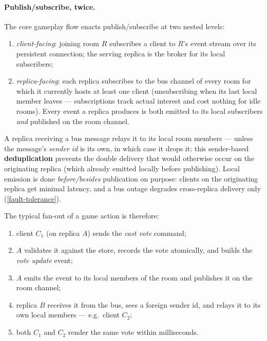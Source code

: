 \documentclass{scrartcl}
\begin{document}
\paragraph{Publish/subscribe, twice.}
The core gameplay flow enacts publish/subscribe at two nested levels:

\begin{enumerate}
  \item \emph{client-facing}: joining room $R$ subscribes a client to
  $R$'s event stream over its persistent connection; the serving replica
  is the broker for its local subscribers;

  \item \emph{replica-facing}: each replica subscribes to the bus channel
  of every room for which it currently hosts at least one client
  (unsubscribing when its last local member leaves --- subscriptions track
  actual interest and cost nothing for idle rooms). Every event a replica
  produces is both emitted to its local subscribers \emph{and} published
  on the room channel.
\end{enumerate}

A replica receiving a bus message relays it to its local room members ---
unless the message's \emph{sender id} is its own, in which case it drops it:
this sender-based \textbf{deduplication} prevents the double delivery that
would otherwise occur on the originating replica (which already emitted
locally before publishing). Local emission is done \emph{before/besides}
publication on purpose: clients on the originating replica get minimal
latency, and a bus outage degrades cross-replica delivery only
(\cref{fault-tolerance}).

The typical fan-out of a game action is therefore:

\begin{enumerate}
  \item client $C_1$ (on replica $A$) sends the \emph{cast vote} command;
  \item $A$ validates it against the store, records the vote atomically,
  and builds the \emph{vote update} event;
  \item $A$ emits the event to its local members of the room and
  publishes it on the room channel;
  \item replica $B$ receives it from the bus, sees a foreign sender id,
  and relays it to its own local members --- e.g.\ client $C_2$;
  \item both $C_1$ and $C_2$ render the same vote within milliseconds.
\end{enumerate}
\end{document}
